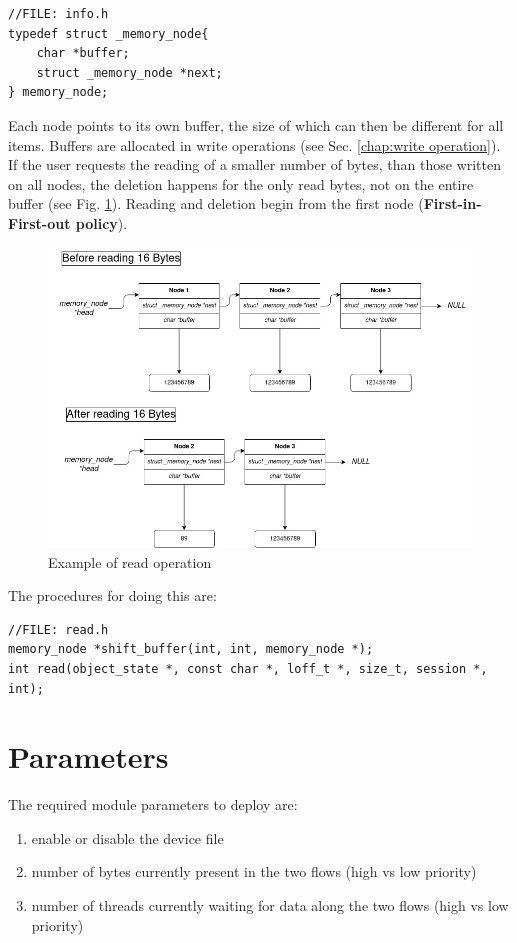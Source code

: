 \documentclass[12pt]{report}
\begin{document}
\begin{lstlisting}
//FILE: info.h
typedef struct _memory_node{
	char *buffer;
	struct _memory_node *next;
} memory_node;
\end{lstlisting}

Each node points to its own buffer, the size of which can then be different for all items. Buffers are allocated in write operations (see Sec. \ref{chap:write operation}). If the user requests the reading of a smaller number of bytes, than those written on all nodes, the deletion happens for the only read bytes, not on the entire buffer (see Fig. \ref{fig:read}). Reading and deletion begin from the first node (\textbf{First-in-First-out policy}). 

\begin{figure}[h]
	\centering
	\includegraphics[scale = .45]{read.jpg}
	\caption{Example of read operation}
	\label{fig:read}
\end{figure}

The procedures for doing this are:

\begin{lstlisting}
//FILE: read.h
memory_node *shift_buffer(int, int, memory_node *);
int read(object_state *, const char *, loff_t *, size_t, session *, int);
\end{lstlisting}

\chapter{Parameters}

The required module parameters to deploy are:

\begin{enumerate}
	\itemsep0em 
	\item enable or disable the device file
	\item number of bytes currently present in the two flows (high vs low priority)
	\item number of threads currently waiting for data along the two flows (high vs low priority)
\end{enumerate}
\end{document}
